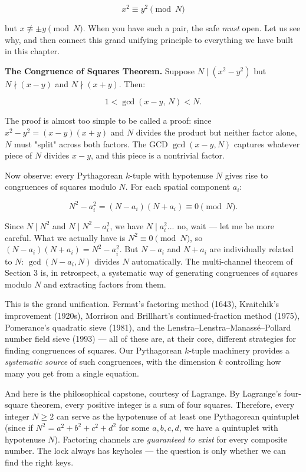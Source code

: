 \[x^2 \equiv y^2 \pmod{N}\]

but $x \not\equiv \pm y \pmod{N}$. When you have such a pair, the safe \textit{must} open. Let us see why, and then connect this grand unifying principle to everything we have built in this chapter.

\textbf{The Congruence of Squares Theorem.} Suppose $N \mid (x^2 - y^2)$ but $N \nmid (x - y)$ and $N \nmid (x + y)$. Then:

\[1 < \gcd(x - y, \, N) < N.\]

The proof is almost too simple to be called a proof: since $x^2 - y^2 = (x - y)(x + y)$ and $N$ divides the product but neither factor alone, $N$ must "split" across both factors. The GCD $\gcd(x - y, N)$ captures whatever piece of $N$ divides $x - y$, and this piece is a nontrivial factor.

Now observe: every Pythagorean $k$-tuple with hypotenuse $N$ gives rise to congruences of squares modulo $N$. For each spatial component $a_i$:

\[N^2 - a_i^2 = (N - a_i)(N + a_i) \equiv 0 \pmod{N}.\]

Since $N \mid N^2$ and $N \mid N^2 - a_i^2$, we have $N \mid a_i^2$... no, wait --- let me be more careful. What we actually have is $N^2 \equiv 0 \pmod{N}$, so $(N - a_i)(N + a_i) = N^2 - a_i^2$. But $N - a_i$ and $N + a_i$ are individually related to $N$: $\gcd(N - a_i, N)$ divides $N$ automatically. The multi-channel theorem of Section 3 is, in retrospect, a systematic way of generating congruences of squares modulo $N$ and extracting factors from them.

This is the grand unification. Fermat's factoring method (1643), Kraitchik's improvement (1920s), Morrison and Brillhart's continued-fraction method (1975), Pomerance's quadratic sieve (1981), and the Lenstra--Lenstra--Manassé--Pollard number field sieve (1993) --- all of these are, at their core, different strategies for finding congruences of squares. Our Pythagorean $k$-tuple machinery provides a \textit{systematic source} of such congruences, with the dimension $k$ controlling how many you get from a single equation.

And here is the philosophical capstone, courtesy of Lagrange. By Lagrange's four-square theorem, every positive integer is a sum of four squares. Therefore, every integer $N \geq 2$ can serve as the hypotenuse of at least one Pythagorean quintuplet (since if $N^2 = a^2 + b^2 + c^2 + d^2$ for some $a, b, c, d$, we have a quintuplet with hypotenuse $N$). Factoring channels are \textit{guaranteed to exist} for every composite number. The lock always has keyholes --- the question is only whether we can find the right keys.




